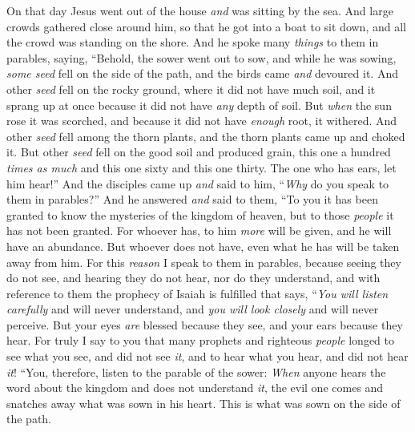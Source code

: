 \begin{biblechapter} %
 On that day Jesus went out of the house \textit{and} was sitting by the sea.
\verse And large crowds gathered close around him, so that he got into a boat to sit down, and all the crowd was standing on the shore.
\verse And he spoke many \textit{things} to them in parables, saying, “Behold, the sower went out to sow,
\verse and while he was sowing, \textit{some seed} fell on the side of the path, and the birds came \textit{and} devoured it.
\verse And other \textit{seed} fell on the rocky ground, where it did not have much soil, and it sprang up at once because it did not have \textit{any} depth of soil.
\verse But \textit{when} the sun rose it was scorched, and because it did not have \textit{enough} root, it withered.
\verse And other \textit{seed} fell among the thorn plants, and the thorn plants came up and choked it.
\verse But other \textit{seed} fell on the good soil and produced grain, this one a hundred \textit{times as much} and this one sixty and this one thirty.
\verse The one who has ears, let him hear!”
 And the disciples came up \textit{and} said to him, “\textit{Why} do you speak to them in parables?”
\verse And he answered \textit{and} said to them, “To you it has been granted to know the mysteries of the kingdom of heaven, but to those \textit{people} it has not been granted.
\verse For whoever has, to him \textit{more} will be given, and he will have an abundance. But whoever does not have, even what he has will be taken away from him.
\verse For this \textit{reason} I speak to them in parables, because seeing they do not see, and hearing they do not hear, nor do they understand,
\verse and with reference to them the prophecy of Isaiah is fulfilled that says,
\verse “\textit{You will listen carefully} and will never understand, 
and \textit{you will look closely} and will never perceive.
\verse But your eyes \textit{are} blessed because they see, and your ears because they hear.
\verse For truly I say to you that many prophets and righteous \textit{people} longed to see what you see, and did not see \textit{it}, and to hear what you hear, and did not hear \textit{it}!
 “You, therefore, listen to the parable of the sower:
\verse \textit{When} anyone hears the word about the kingdom and does not understand \textit{it}, the evil one comes and snatches away what was sown in his heart. This is what was sown on the side of the path.

\end{biblechapter}
